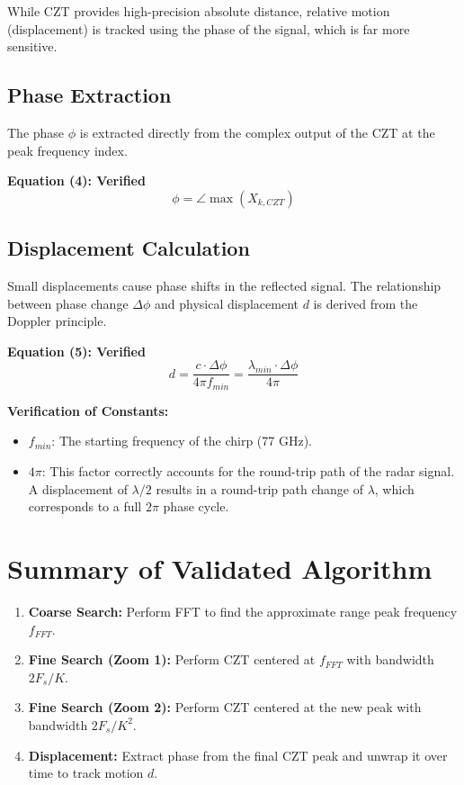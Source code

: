 \documentclass[11pt, a4paper]{article}
\begin{document}
While CZT provides high-precision absolute distance, relative motion (displacement) is tracked using the phase of the signal, which is far more sensitive.

\subsection{Phase Extraction}
The phase $\phi$ is extracted directly from the complex output of the CZT at the peak frequency index.

\textbf{Equation (4): Verified}
\begin{equation}
    \phi = \angle \max \left( X_{k, CZT} \right)
\end{equation}

\subsection{Displacement Calculation}
Small displacements cause phase shifts in the reflected signal. The relationship between phase change $\Delta \phi$ and physical displacement $d$ is derived from the Doppler principle.

\textbf{Equation (5): Verified}
\begin{equation}
    d = \frac{c \cdot \Delta \phi}{4\pi f_{min}} = \frac{\lambda_{min} \cdot \Delta \phi}{4\pi}
\end{equation}

\noindent \textbf{Verification of Constants:}
\begin{itemize}
    \item $f_{min}$: The starting frequency of the chirp (77 GHz).
    \item $4\pi$: This factor correctly accounts for the round-trip path of the radar signal. A displacement of $\lambda/2$ results in a round-trip path change of $\lambda$, which corresponds to a full $2\pi$ phase cycle.
\end{itemize}

\section{Summary of Validated Algorithm}
\begin{enumerate}
    \item \textbf{Coarse Search:} Perform FFT to find the approximate range peak frequency $f_{FFT}$.
    \item \textbf{Fine Search (Zoom 1):} Perform CZT centered at $f_{FFT}$ with bandwidth $2F_s/K$.
    \item \textbf{Fine Search (Zoom 2):} Perform CZT centered at the new peak with bandwidth $2F_s/K^2$.
    \item \textbf{Displacement:} Extract phase from the final CZT peak and unwrap it over time to track motion $d$.
\end{enumerate}
\end{document}
